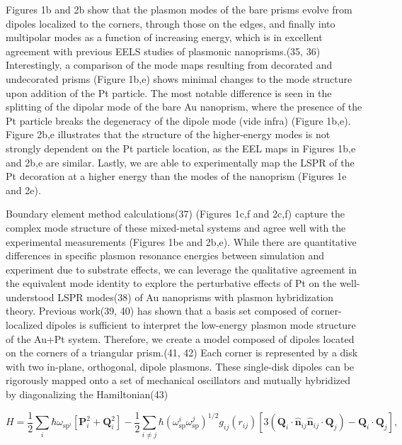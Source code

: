 \documentclass [11pt, proquest] {uwthesis}[2016/11/22]
\begin{document}
Figures 1b and 2b show that the plasmon modes of the bare prisms evolve from dipoles localized to the corners, through those on the edges, and finally into multipolar modes as a function of increasing energy, which is in excellent agreement with previous EELS studies of plasmonic nanoprisms.(35, 36) Interestingly, a comparison of the mode maps resulting from decorated and undecorated prisms (Figure 1b,e) shows minimal changes to the mode structure upon addition of the Pt particle. The most notable difference is seen in the splitting of the dipolar mode of the bare Au nanoprism, where the presence of the Pt particle breaks the degeneracy of the dipole mode (vide infra) (Figure 1b,e). Figure 2b,e illustrates that the structure of the higher-energy modes is not strongly dependent on the Pt particle location, as the EEL maps in Figures 1b,e and 2b,e are similar. Lastly, we are able to experimentally map the LSPR of the Pt decoration at a higher energy than the modes of the nanoprism (Figures 1e and 2e).

Boundary element method calculations(37) (Figures 1c,f and 2c,f) capture the complex mode structure of these mixed-metal systems and agree well with the experimental measurements (Figures 1be and 2b,e). While there are quantitative differences in specific plasmon resonance energies between simulation and experiment due to substrate effects, we can leverage the qualitative agreement in the equivalent mode identity to explore the perturbative effects of Pt on the well-understood LSPR modes(38) of Au nanoprisms with plasmon hybridization theory. Previous work(39, 40) has shown that a basis set composed of corner-localized dipoles is sufficient to interpret the low-energy plasmon mode structure of the Au+Pt system. Therefore, we create a model composed of dipoles located on the corners of a triangular prism.(41, 42) Each corner is represented by a disk with two in-plane, orthogonal, dipole plasmons. These single-disk dipoles can be rigorously mapped onto a set of mechanical oscillators and mutually hybridized by diagonalizing the Hamiltonian(43)

\begin{equation}
H = \frac{1}{2}\sum_{i}\hbar\omega_{\textrm{sp}^i}[\textbf{P}_i^2 + \textbf{Q}_i^2] - \frac{1}{2}\sum_{i \neq j}\hbar(\omega_{\textrm{sp}}^i\omega_{\textrm{sp}}^j)^{1/2}g_{ij}(r_{ij})[3(\textbf{Q}_i\cdot\hat{\textbf{n}}_{ij}\hat{\textbf{n}}_{ij}\cdot\textbf{Q}_j)-\textbf{Q}_i\cdot\textbf{Q}_j],
\end{equation}
\end{document}
